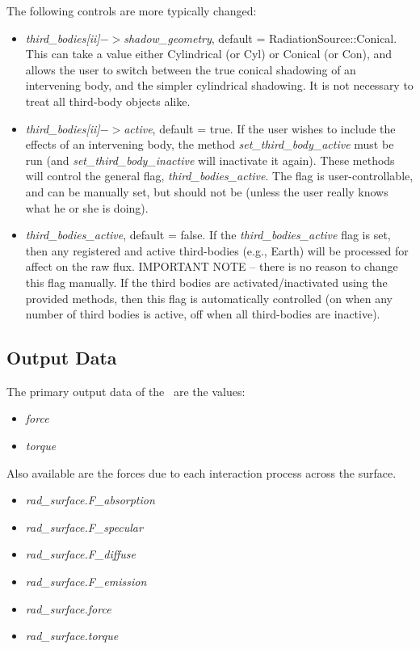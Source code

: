 The following controls are more typically changed:
\begin{itemize}
\item{\textit{third\_bodies[ii]$->$shadow\_geometry}, default = RadiationSource::Conical}.
\newline
This can take a value either Cylindrical (or Cyl) or Conical (or Con), and allows the user to switch between the true conical shadowing of an intervening body, and the simpler cylindrical shadowing.  It is not necessary to treat all third-body objects alike.
\item{\textit{third\_bodies[ii]$->$active}, default = true}. \newline
If the user wishes to include the effects of an intervening body, the method \textit{set\_third\_body\_active} must be run (and \textit{set\_third\_body\_inactive} will inactivate it again).  These methods will control the general flag, \textit{third\_bodies\_active}.
The flag is user-controllable, and can be manually set, but should not be (unless the user really knows what he or she is doing).
\item{\textit{third\_bodies\_active}, default = false}. \newline
If the \textit{third\_bodies\_active} flag is set, then any registered and active third-bodies (e.g., Earth) will be processed for affect on the raw flux.
IMPORTANT NOTE -- there is no reason to change this flag manually.  If the third bodies are activated/inactivated using the provided methods, then this flag is automatically controlled (on when any number of third bodies is active, off when all third-bodies are inactive).
\end{itemize}


\subsection{Output Data}
The primary output data of the \RadiationPressureDesc\ are the values:
\begin{itemize}
\item{\textit{force}}
\item{\textit{torque}}
\end{itemize}

Also available are the forces due to each interaction process across the surface.

\begin{itemize}
\item{\textit{rad\_surface.F\_absorption}}
\item{\textit{rad\_surface.F\_specular}}
\item{\textit{rad\_surface.F\_diffuse}}
\item{\textit{rad\_surface.F\_emission}}
\item{\textit{rad\_surface.force}}
\item{\textit{rad\_surface.torque}}
\end{itemize}

